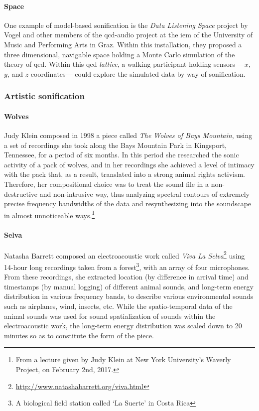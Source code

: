 \paragraph{Space}
One example of model-based sonification is the \textit{Data Listening Space} project by Vogel and other members of the \gls{qcd-audio} project \parencite{icmc/bbp2372.2012.096} at the \gls{iem} of the University of Music and Performing Arts in Graz. Within this installation, they proposed a three dimensional, navigable space holding a Monte Carlo simulation of the theory of \gls{qed}. Within this \gls{qed} \textit{lattice}, a walking participant holding sensors ---$x$, $y$, and $z$ coordinates--- could explore the simulated data by way of sonification.

\subsubsection{Artistic sonification}
\label{sonification:artistic}

\paragraph{Wolves}
Judy Klein composed in 1998 a piece called \textit{The Wolves of Bays Mountain}, using a set of recordings she took along the Bays Mountain Park in Kingsport, Tennessee, for a period of six months. In this period she researched the sonic activity of a pack of wolves, and in her recordings she achieved a level of intimacy with the pack that, as a result, translated into a strong animal rights activism. Therefore, her compositional choice was to treat the sound file in a non-destructive and non-intrusive way, thus analyzing spectral contours of extremely precise frequency bandwidths of the data and resynthesizing into the soundscape in almost unnoticeable ways.\footnote{From a lecture given by Judy Klein at New York University's Waverly Project, on February 2nd, 2017.}

\paragraph{Selva}
Natasha Barrett \parencite{icmc/bbp2372.2000.123} composed an electroacoustic work called \textit{Viva La Selva}\footnote{\url{http://www.natashabarrett.org/viva.html}} using 14-hour long recordings taken from a forest\footnote{A biological field station called `La Suerte' in Costa Rica}, with an array of four microphones. From these recordings, she extracted location (by difference in arrival time) and timestamps (by manual logging) of different animal sounds, and long-term energy distribution in various frequency bands, to describe various environmental sounds such as airplanes, wind, insects, etc. While the spatio-temporal data of the animal sounds was used for sound spatialization of sounds within the electroacoustic work, the long-term energy distribution was scaled down to 20 minutes so as to constitute the form of the piece.

